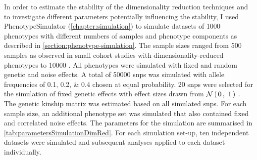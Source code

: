 In order to estimate the stability of the dimensionality reduction techniques and to investigate different parameters potentially influencing the stability, I used PhenotypeSimulator (\cref{chapter:simulation}) to simulate datasets of \num{1000} phenotypes with different numbers of samples and phenotype components as described in \cref{section:phenotype-simulation}. The sample sizes ranged from \num{500} samples as observed in small cohort studies with dimensionality-reduced phenotypes \citep{Pausova2007} to \num{10000} \citep{Liu2012}. All phenotypes were simulated with fixed and random genetic and noise effects. A total of \num{50000} \glspl{snp} was simulated with allele frequencies of \numlist{0.1;0.2;0.4} chosen at equal probability. \num{20} \glspl{snp} were selected for the simulation of fixed genetic effects with effect sizes drawn from \(\mathcal{N}\left(\,{0}\,,~{1}\,\right)\) . The genetic kinship matrix was estimated based on all simulated \glspl{snp}. For each sample size, an additional phenotype set was simulated that also contained fixed and correlated noise effects. The parameters for the simulation are summarised in \cref{tab:parametersSimulationDimRed}. For each simulation set-up, ten independent datasets were simulated and subsequent analyses applied to each dataset individually.

